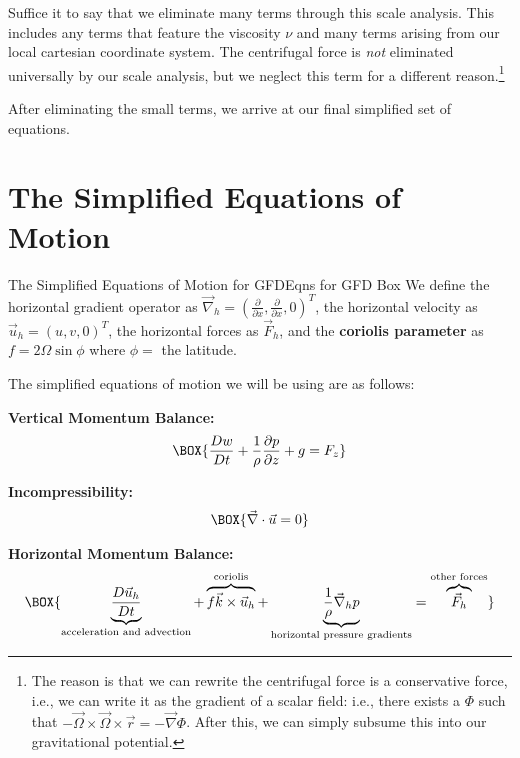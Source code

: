 Suffice it to say that we eliminate many terms through this scale analysis. This includes any terms that feature the viscosity $\nu$ and many terms arising from our local cartesian coordinate system. The centrifugal force is \textit{not} eliminated universally by our scale analysis, but we neglect this term for a different reason.\footnote{The reason is that we can rewrite the centrifugal force is a conservative force, i.e., we can write it as the gradient of a scalar field: i.e., there exists a $\Phi$ such that $-\vec{\Omega}\times\vec{\Omega}\times\vec{r}=-\vec{\nabla}\Phi$. After this, we can simply subsume this into our gravitational potential.}

After eliminating the small terms, we arrive at our final simplified set of equations. 

\section{The Simplified Equations of Motion}

\begin{fact}{The Simplified Equations of Motion for GFD}{Eqns for GFD Box}\label{Eqns for GFD Box}
    We define the horizontal gradient operator as $\vec{\nabla}_h=\left( \frac{\partial}{\partial x},\frac{\partial}{\partial x},0 \right)^T$, the horizontal velocity as $\vec{u}_h=\left( u,v,0 \right)^T$, the horizontal forces as $\vec{F}_h$, and the \textbf{coriolis parameter} as $f=2\Omega\sin\phi$ where $\phi=$ the latitude.

    The simplified equations of motion we will be using are as follows: \vspace{2mm}

    \begin{minipage}{0.48\linewidth}
        \centering
        \textbf{Vertical Momentum Balance:}
        \begin{gather}
            \label{Vertical Approximate}
            \BOX{\frac{Dw}{Dt}+\frac{1}{\rho}\frac{\partial p }{\partial z}+g=F_z}
        \end{gather}
    \end{minipage}
    \hfill
    \begin{minipage}{0.48\linewidth}
        \centering
        \textbf{Incompressibility:}
        \begin{gather}
            \label{Incompressibility}
        \BOX{\vec{\nabla}\cdot\vec{u}=0}
        \end{gather}
    \end{minipage}

    \vspace{2mm}
    \centering
    \textbf{Horizontal Momentum Balance:}
    \begin{gather}
        \label{Horizontal Approximate}
        \BOX{\underbrace{\frac{D\vec{u}_h}{Dt}}_\text{acceleration and advection}+
        \overbrace{f\vec{k}\times\vec{u}_h}^\text{coriolis}+
        \underbrace{\frac{1}{\rho}\vec{\nabla}_hp}_\text{horizontal pressure gradients}=\overbrace{\vec{F}_h}^\text{other forces}}
    \end{gather}
\end{fact}

